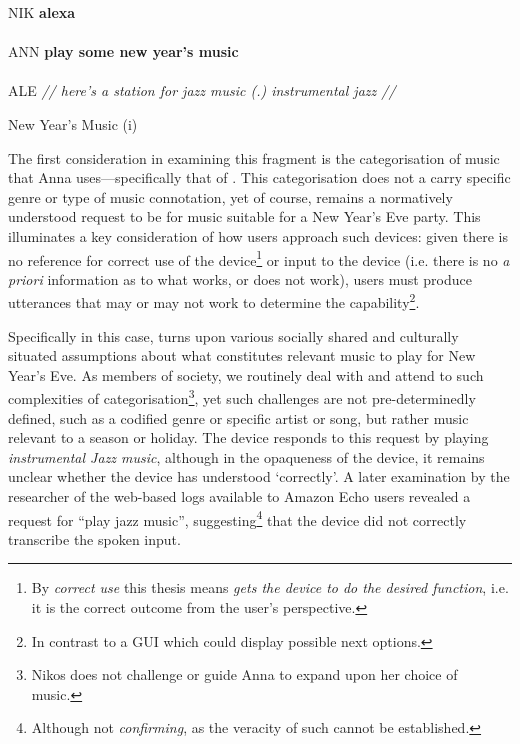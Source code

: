 \begin{inlinefrag}
    {
    \begin{transcript}
        \by NIK {\textbf{alexa}} \\
         \\
        \by ANN {\textbf{play some new year’s music}} \\
         \\
        \by ALE {\textit{// here’s a station for jazz music (.) instrumental jazz //}} \\
    \end{transcript}
    \caption{New Year's Music (i)}\label{frag:empirical home findings music-i}
    }
\end{inlinefrag}

\begin{revisedsubmission}
The first consideration in examining this fragment is the categorisation of music that Anna uses---specifically that of .
This categorisation does not a carry specific genre or type of music connotation, yet of course, remains a normatively understood request to be for music suitable for a New Year's Eve party.
This illuminates a key consideration of how users approach such devices: given there is no reference for correct use of the device\footnote{By \textit{correct use} this thesis means \textit{gets the device to do the desired function}, i.e. it is the correct outcome from the user's perspective.} or input to the device (i.e. there is no \textit{a priori} information as to what works, or does not work), users must produce utterances that may or may not work to determine the capability\footnote{In contrast to a \ac{GUI} which could display possible next options.}.

Specifically in this case,  turns upon various socially shared and culturally situated assumptions about what constitutes relevant music to play for New Year's Eve.
As members of society, we routinely deal with and attend to such complexities of categorisation\footnote{Nikos does not challenge or guide Anna to expand upon her choice of music.}, yet such challenges are not pre-determinedly defined, such as a codified genre or specific artist or song, but rather music relevant to a season or holiday. %
The device responds to this request by playing \textit{instrumental Jazz music}, although in the opaqueness of the device, it remains unclear whether the device has understood `correctly'.
A later examination by the researcher of the web-based logs available to Amazon Echo users revealed a request for ``play jazz music'', suggesting\footnote{Although not \textit{confirming}, as the veracity of such cannot be established.} that the device did not correctly transcribe the spoken input.
\end{revisedsubmission}



